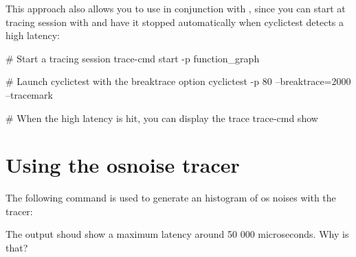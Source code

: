 This approach also allows you to use  in conjunction with ,
since you can start at tracing session with  and have it
stopped automatically when cyclictest detects a high latency:

\begin{bashinput}
        # Start a tracing session
        trace-cmd start -p function_graph

        # Launch cyclictest with the breaktrace option
        cyclictest -p 80 --breaktrace=2000 --tracemark

        # When the high latency is hit, you can display the trace
        trace-cmd show
\end{bashinput}

\section{Using the osnoise tracer}

The following command is used to generate an histogram of os noises with the 
 tracer:


The output shoud show a maximum latency around 50 000 microseconds. Why is that?

